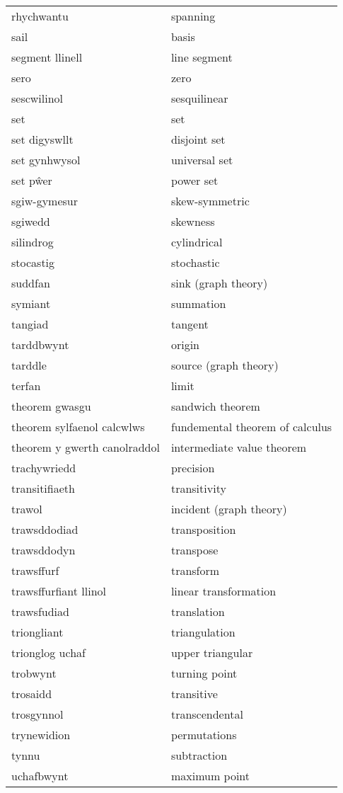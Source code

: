 \begin{supertabular}{p{0.22\textwidth}p{0.22\textwidth}}
rhychwantu & spanning \\
sail & basis \\
segment llinell & line segment \\
sero & zero \\
sescwilinol & sesquilinear \\
set & set \\
set digyswllt & disjoint set \\
set gynhwysol & universal set \\
set pŵer & power set \\
sgiw-gymesur & skew-symmetric \\
sgiwedd & skewness \\
silindrog & cylindrical \\
stocastig & stochastic \\
suddfan & sink (graph theory) \\
symiant & summation \\
tangiad & tangent \\
tarddbwynt & origin \\
tarddle & source (graph theory) \\
terfan & limit \\
theorem gwasgu & sandwich theorem \\
theorem sylfaenol calcwlws & fundemental theorem of calculus \\
theorem y gwerth canolraddol & intermediate value theorem \\
trachywriedd & precision \\
transitifiaeth & transitivity \\
trawol & incident (graph theory) \\
trawsddodiad & transposition \\
trawsddodyn & transpose \\
trawsffurf & transform \\
trawsffurfiant llinol & linear transformation \\
trawsfudiad & translation \\
triongliant & triangulation \\
trionglog uchaf & upper triangular \\
trobwynt & turning point \\
trosaidd & transitive \\
trosgynnol & transcendental \\
trynewidion & permutations \\
tynnu & subtraction \\
uchafbwynt & maximum point \\

\end{supertabular}
